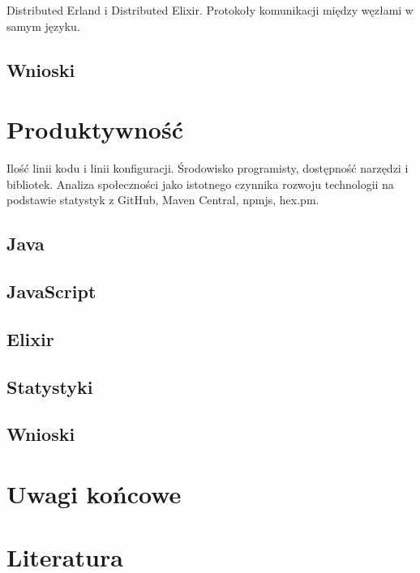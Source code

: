 Distributed Erland i Distributed Elixir. Protokoły komunikacji między
węzłami w samym języku.

\subsection{Wnioski}

\section{Produktywność}

Ilość linii kodu i linii konfiguracji. Środowisko programisty,
dostępność narzędzi i bibliotek. Analiza społeczności jako istotnego
czynnika rozwoju technologii na podstawie statystyk z GitHub, Maven
Central, npmjs, hex.pm.

\subsection{Java}

\subsection{JavaScript}

\subsection{Elixir}

\subsection{Statystyki}

\subsection{Wnioski}

\section{Uwagi końcowe}

\section{Literatura}
